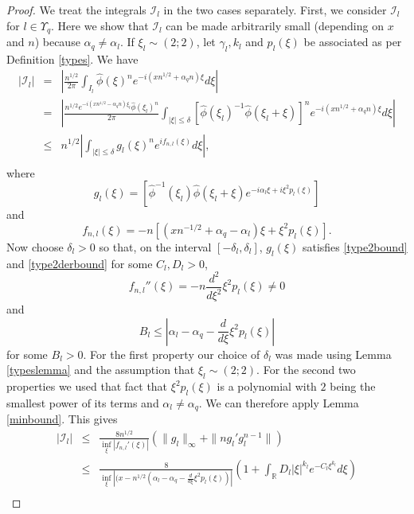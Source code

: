 \documentclass{article}
\theoremstyle{theorem}
\theoremstyle{remark}
\begin{document}
\begin{proof}
We treat the integrals $\mathcal{I}_l$ in the two cases separately. First, we consider
$\mathcal{I}_{l}$ for $l\in\Upsilon_q$. Here we show that $\mathcal{I}_l$ can be made arbitrarily small (depending on $x$ and $n$) because $\alpha_q\neq \alpha_l$. If $\xi_l\sim(2;2)$, let $\gamma_l,k_l$ and $p_l(\xi)$ be associated as per Definition \ref{types}. We have 
\begin{eqnarray*}
|\mathcal{I}_l|&=&\left|\frac{n^{1/2}}{2\pi}\int_{I_l}
\hat{\phi}(\xi)^ne^{-i(xn^{1/2}+\alpha_q n)\xi}d\xi\right|\\
&=&\left|\frac{n^{1/2}e^{-i(xn^{1/2}-\alpha_q n)\xi_l}\hat{\phi}(\xi_l)^n}{2\pi
}\int_{|\xi|\leq\delta}\left[\hat{\phi}(\xi_l)^{-1}\hat{\phi}(\xi_l+\xi)\right]^n
e^{-i(xn^{1/2}+\alpha_q n)\xi}d\xi\right|\\
&\leq& n^{1/2}\left|\int_{|\xi|\leq\delta}g_l(\xi)^n e^{if_{n,l}(\xi)}d\xi\right|,\\
\end{eqnarray*}
where
\begin{equation*}
 g_l(\xi)=[\hat{\phi}^{-1}(\xi_l)\hat{\phi}(\xi_l+\xi)e^{-i\alpha_l\xi+i\xi^2p_l(\xi)}]
\end{equation*}
and
\begin{equation*}
 f_{n,l}(\xi)=-n[(xn^{-1/2}+\alpha_q-\alpha_l)\xi+\xi^2p_l(\xi)].
\end{equation*}
Now choose $\delta_l>0$ so that, on the interval $[-\delta_l,\delta_l]$,  $g_l(\xi)$ satisfies \eqref{type2bound} and \eqref{type2derbound} for some $C_l,D_l>0$, 
\begin{equation*}
 f_{n,l}''(\xi)=-n\frac{d^2}{d\xi^2}\xi^2p_l(\xi)\neq 0
\end{equation*}
and
\begin{equation}\label{estbq}
 B_l\leq \left|\alpha_l-\alpha_q-\frac{d}{d\xi}\xi^2p_l(\xi)\right|
\end{equation}
for some $B_l>0$. For the first property our choice of $\delta_l$ was made using Lemma \ref{typeslemma} and the assumption that $\xi_l\sim(2;2)$. For the second two properties we used that fact that $\xi^2p_l(\xi)$ is a polynomial with $2$ being the smallest power of its terms and $\alpha_l\neq\alpha_q$. We can therefore apply Lemma \ref{minbound}. This gives
\begin{eqnarray*}
|\mathcal{I}_l|&\leq& \frac{8n^{1/2}}{\inf_{\xi}|f_{n,l}'(\xi)|}(\|g_l\|_\infty+\|ng_l'g_l^{n-1}\|)\\
&\leq& \frac{8}{\inf_{\xi}|(x-n^{1/2}(\alpha_l-\alpha_q-\frac{d}{d\xi}\xi^2p_l(\xi))|}\left(1+\int_{\mathbb{R}}D_l|\xi|^{k_l}e^{-C_l\xi^{k_l}}d\xi\right)\\

\end{eqnarray*}
\end{proof}
\end{document}
